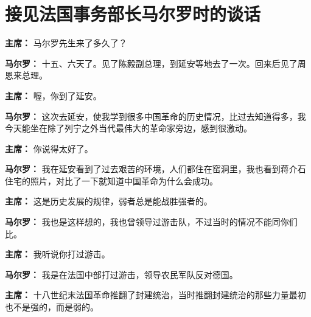 \section[接见法国事务部长马尔罗时的谈话（一九六五年八月三日）]{接见法国事务部长马尔罗时的谈话}

\begin{list}{}{
    \setlength{\topsep}{0pt}        %
    \setlength{\partopsep}{0pt}     %
    \setlength{\parsep}{\parskip}   %
    \setlength{\itemsep}{\lineskip}       %
    \setlength{\labelsep}{0pt}%
    \setlength{\labelwidth}{3em}%
    \setlength{\itemindent}{0pt}%
    \setlength\listparindent{\parindent}
    \setlength{\leftmargin}{3em}
    \setlength{\rightmargin}{0pt}
    }

\item[\textbf{主席：}] 马尔罗先生来了多久了？

\item[\textbf{马尔罗：}] 十五、六天了。见了陈毅副总理，到延安等地去了一次。回来后见了周恩来总理。

\item[\textbf{主席：}] 喔，你到了延安。

\item[\textbf{马尔罗：}] 这次去延安，使我学到很多中国革命的历史情况，比过去知道得多，我今天能坐在除了列宁之外当代最伟大的革命家旁边，感到很激动。

\item[\textbf{主席：}] 你说得太好了。

\item[\textbf{马尔罗：}] 我在延安看到了过去艰苦的环境，人们都住在窑洞里，我也看到蒋介石住宅的照片，对比了一下就知道中国革命为什么会成功。

\item[\textbf{主席：}] 这是历史发展的规律，弱者总是能战胜强者的。

\item[\textbf{马尔罗：}] 我也是这样想的，我也曾领导过游击队，不过当时的情况不能同你们比。

\item[\textbf{主席：}] 我听说你打过游击。

\item[\textbf{马尔罗：}] 我是在法国中部打过游击，领导农民军队反对德国。

\item[\textbf{主席：}] 十八世纪末法国革命推翻了封建统治，当时推翻封建统治的那些力量最初也不是强的，而是弱的。


\end{list}
